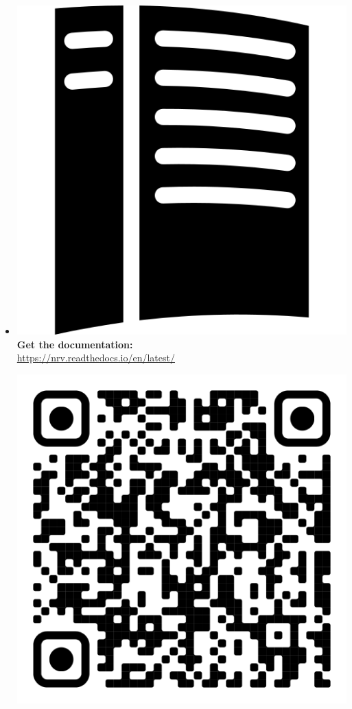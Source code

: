 \documentclass{NRVposter}
\begin{document}
\begin{columns}
{\begin{itemize}
\begin{center}
        \end{center}
        \item \includegraphics[width=0.015\columnwidth]{./images/rtd_logo.png} \textbf{Get the documentation:} \\ \url{https://nrv.readthedocs.io/en/latest/}\\
        \begin{center}
            \includegraphics[width=0.08\columnwidth]{./images/qrcode_rtd.png}
        \end{center}
    \end{itemize}
    

    
}


\end{columns}
\end{document}
